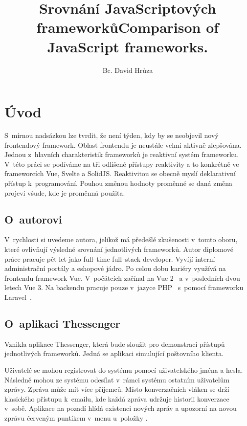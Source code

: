 \documentclass[
  master,
  program=ainf,
  printversion,
  tables=false,
  sourcecodes,
  glossaries,
  index
]{kidiplom}
\title{Srovnání JavaScriptových frameworků}
\title[english]{Comparison of JavaScript frameworks.}
\subtitle{}
\subtitle[english]{}
\author{Bc. David Hrůza}
\begin{document}
\maketitle


\section {Úvod}
S~mírnou nadsázkou lze tvrdit, že není týden, kdy by se neobjevil nový frontendový
framework. Oblast frontendu je neustále velmi aktivně zlepšována. Jednou z~hlavních
charakteristik frameworků je reaktivní systém frameworku. V~této práci se podíváme 
na tři odlišené přístupy reaktivity a to konkrétně ve frameworcích Vue, Svelte a SolidJS.
Reaktivitou se obecně myslí deklarativní přístup k~programování. Pouhou změnou hodnoty proměnné
se daná změna projeví všude, kde je proměnná použita.

\subsection{O~autorovi}
V~rychlosti si uvedeme autora, jelikož má předešlé zkušenosti v~tomto oboru, které ovlivňují výsledné srovnání jednotlivých frameworků.
Autor diplomové práce pracuje pět let jako full--time full--stack developer.
Vyvíjí interní administrační portály a eshopové jádro. Po celou dobu kariéry
využívá na frontendu framework Vue. V~počátcích začínal na Vue 2~\cite{vue2} a v~posledních
dvou letech Vue 3. Na backendu pracuje pouze v~jazyce PHP~\cite{php} s~pomocí frameworku
Laravel~\cite{laravel}. 

\subsection{O~aplikaci Thessenger}
Vznikla aplikace Thessenger, která bude sloužit pro demonstraci přístupů jednotlivých frameworků. 
Jedná se aplikaci simulující poštovního klienta.

Uživatelé se mohou registrovat do systému pomocí uživatelského jména a hesla.
Následně mohou ze systému odesílat v~rámci systému ostatním uživatelům zprávy.
Zpráva může mít více příjemců. Místo konverzačních vláken se drží klasického
přístupu k~emailu, kde každá zpráva udržuje historii konverzace v~sobě.
Aplikace na pozadí hlídá existenci nových zpráv a upozorní na novou zprávu
červeným puntíkem v~menu u~položky .
\end{document}
